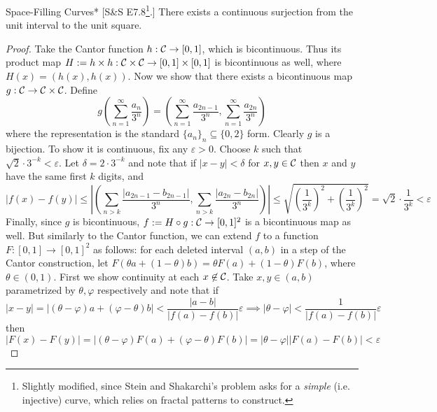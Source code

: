 \begin{problem}{Space-Filling Curves}*
    [S\&S E7.8\footnote{Slightly modified, since Stein and Shakarchi's problem asks for a \emph{simple} (i.e. injective) curve, which relies on fractal patterns to construct.}.] There exists a continuous surjection from the unit interval to the unit square.
\end{problem}

\begin{proof}
    Take the Cantor function \(h : \mathcal{C} \to [0, 1]\), which is bicontinuous. Thus its product map \(H := h \times h : \mathcal{C} \times \mathcal{C} \to [0,1] \times [0,1]\) is bicontinuous as well, where \(H(x) = (h(x), h(x))\). Now we show that there exists a bicontinuous map \(g : \mathcal{C} \to \mathcal{C} \times \mathcal{C}\). Define
    \[
        g \left( \sum_{n=1}^\infty \frac{a_n}{3^n} \right) 
        = \left( \sum_{n=1}^\infty \frac{a_{2n-1}}{3^n}, \sum_{n=1}^\infty \frac{a_{2n}}{3^n} \right)
    \]
    where the representation is the standard \(\{a_n\}_n \subseteq \{0, 2\}\) form. Clearly \(g\) is a bijection. To show it is continuous, fix any \(\varepsilon > 0\). Choose \(k\) such that \(\sqrt{2} \cdot 3^{-k} < \varepsilon\). Let \(\delta = 2 \cdot 3^{-k}\) and note that if \(|x - y| < \delta\) for \(x,y \in \mathcal{C}\) then \(x\) and \(y\) have the same first \(k\) digits, and 
    \[
        |f(x) - f(y)|
        \leq \left| \left( \sum_{n > k} \frac{|a_{2n-1} - b_{2n-1}|}{3^n}, \sum_{n > k} \frac{|a_{2n} - b_{2n}|}{3^n} \right) \right| 
        \leq \sqrt{\left(\frac{1}{3^k}\right)^2 + \left(\frac{1}{3^k} \right)^2}
        = \sqrt{2} \cdot \frac{1}{3^k} 
        < \varepsilon
    \]
    Finally, since \(g\) is bicontinuous, \(f := H \circ g : \mathcal{C} \to [0, 1]^2\) is a bicontinuous map as well. But similarly to the Cantor function, we can extend \(f\) to a function \(F : [0, 1] \to [0, 1]^2\) as follows: for each deleted interval \((a, b)\) in a step of the Cantor construction, let \(F(\theta a + (1 - \theta)b) = \theta F(a) + (1 - \theta) F(b)\), where \(\theta \in (0, 1)\). First we show continuity at each \(x \not\in \mathcal{C}\). Take \(x, y \in (a, b)\) parametrized by \(\theta, \varphi\) respectively and note that if
    \[
        |x - y| = |(\theta - \varphi)a + (\varphi - \theta)b| 
        < \frac{|a - b|}{|f(a) - f(b)|} \varepsilon
        \implies |\theta - \varphi| < \frac{1}{|f(a) - f(b)|} \varepsilon
    \]
    then 
    \[
        |F(x) - F(y)|
        = |(\theta - \varphi) F(a) + (\varphi - \theta) F(b)|
        = |\theta - \varphi| |F(a) - F(b)|
        < \varepsilon
    \]

\end{proof}
